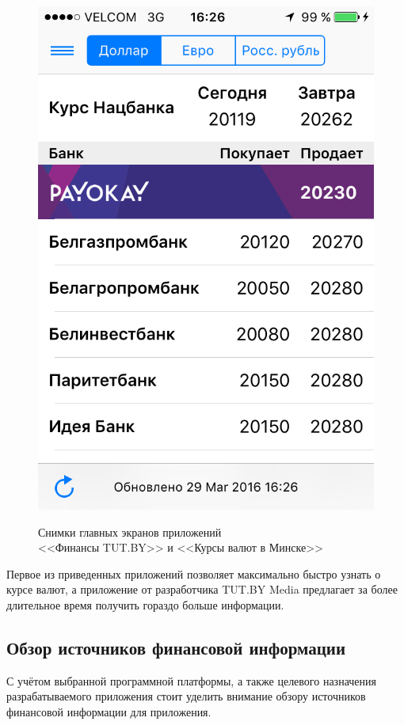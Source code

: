 \begin{figure} [h]
\begin{minipage} [h] {0.49\linewidth}
{      \includegraphics[width=0.85\linewidth]{fig/exchanges_minsk_screen}
      }
    \end{minipage}
  \caption{Снимки главных экранов приложений \\ <<Финансы TUT.BY>> и <<Курсы валют в Минске>>}
  \label{fig:tutby_exchanges_minsk_screenshots}
\end{figure}

Первое из приведенных приложений позволяет
максимально быстро узнать о курсе валют, а приложение от разработчика TUT.BY Media
предлагает за более длительное время получить гораздо больше информации.


\subsection{Обзор источников финансовой информации}

С учётом выбранной программной платформы, а также целевого назначения
разрабатываемого приложения стоит уделить внимание обзору источников
финансовой информации для приложения.


